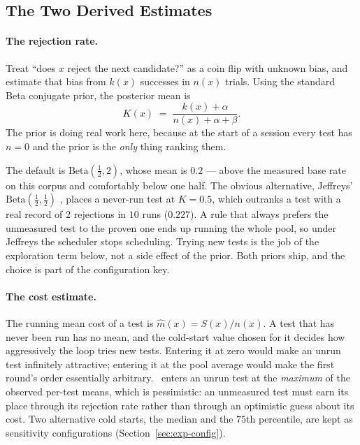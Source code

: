 \subsection{The Two Derived Estimates}

\paragraph{The rejection rate.} Treat ``does $x$ reject the next candidate?'' as
a coin flip with unknown bias, and estimate that bias from $k(x)$ successes in
$n(x)$ trials. Using the standard Beta conjugate prior, the posterior mean is
\begin{equation}
K(x) \;=\; \frac{k(x) + \alpha}{n(x) + \alpha + \beta}.
\label{eq:K}
\end{equation}
The prior is doing real work here, because at the start of a session every
test has $n = 0$ and the prior is the \emph{only} thing ranking them.

The default is $\mathrm{Beta}(\tfrac12, 2)$, whose mean is $0.2$ --- above
the measured base rate on this corpus and comfortably below one half. The
obvious alternative, Jeffreys' $\mathrm{Beta}(\tfrac12,\tfrac12)$
\citep{jeffreys1946invariant}, places a never-run test at $K = 0.5$, which
outranks a test with a real record of $2$ rejections in $10$ runs ($0.227$). A
rule that always prefers the unmeasured test to the proven one ends up running
the whole pool, so under Jeffreys the scheduler stops scheduling. Trying new
tests is the job of the exploration term below, not a side effect of the
prior. Both priors ship, and the choice is part of the configuration key.

\paragraph{The cost estimate.} The running mean cost of a test is
$\hat{m}(x) = S(x)/n(x)$. A test that has never been run has no mean, and the
cold-start value chosen for it decides how aggressively the loop tries new
tests. Entering it at zero would make an unrun test infinitely attractive;
entering it at the pool average would make the first round's order essentially
arbitrary. \caster\ enters an unrun test at the \emph{maximum} of the observed
per-test means, which is pessimistic: an unmeasured test must earn its place
through its rejection rate rather than through an optimistic guess about its
cost. Two alternative cold starts, the median and the $75$th percentile, are
kept as sensitivity configurations (Section~\ref{sec:exp-config}).

